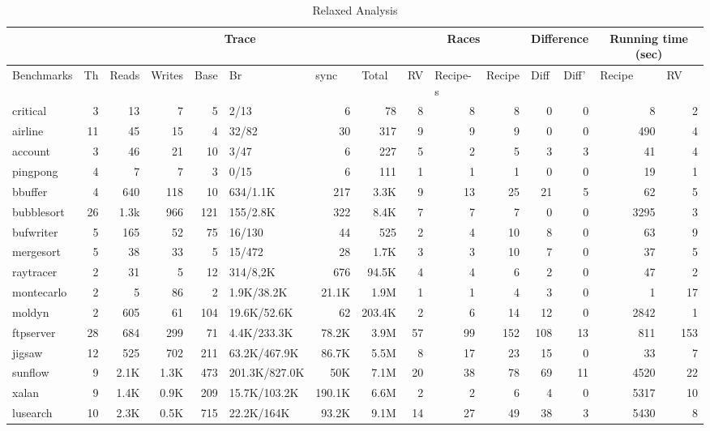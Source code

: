 \begin{table}[htbp]
\caption{Relaxed Analysis}
\begin{tabular}{|l|r|r|r|r|l|r|r|r|r|r|r|r|r|r|}
\hline
 & \multicolumn{ 7}{c|}{Trace} & \multicolumn{ 3}{c|}{Races} & \multicolumn{ 2}{c|}{Difference} & \multicolumn{ 2}{c|}{Running time (sec)} \\ \hline
Benchmarks & \multicolumn{1}{l|}{Th} & \multicolumn{1}{l|}{Reads} & \multicolumn{1}{l|}{Writes} & \multicolumn{1}{l|}{Base} & Br & \multicolumn{1}{l|}{sync} & \multicolumn{1}{l|}{Total} & \multicolumn{1}{l|}{RV} & \multicolumn{1}{l|}{Recipe-s} & \multicolumn{1}{l|}{Recipe} & \multicolumn{1}{l|}{Diff} & \multicolumn{1}{l|}{Diff'} & \multicolumn{1}{l|}{Recipe} & \multicolumn{1}{l|}{RV} \\ \hline
critical & 3 & 13 & 7 & 5 & 2/13 & 6 & 78 & 8 & 8 & 8 & 0 & 0 & 8 & 2 \\ \hline
airline & 11 & 45 & 15 & 4 & 32/82 & 30 & 317 & 9 & 9 & 9 & 0 & 0 & 490 & 4 \\ \hline
account & 3 & 46 & 21 & 10 & 3/47 & 6 & 227 & 5 & 2 & 5 & 3 & 3 & 41 & 4 \\ \hline
pingpong & 4 & 7 & 7 & 3 & 0/15 & 6 & 111 & 1 & 1 & 1 & 0 & 0 & 19 & 1 \\ \hline
bbuffer & 4 & 640 & 118 & 10 & 634/1.1K & 217 & 3.3K & 9 & 13 & 25 & 21 & 5 & 62 & 5 \\ \hline
bubblesort & 26 & 1.3k & 966 & 121 & 155/2.8K & 322 & 8.4K & 7 & 7 & 7 & 0 & 0 & 3295 & 3 \\ \hline
bufwriter & 5 & 165 & 52 & 75 & 16/130 & 44 & 525 & 2 & 4 & 10 & 8 & 0 & 63 & 9 \\ \hline
mergesort & 5 & 38 & 33 & 5 & 15/472 & 28 & 1.7K & 3 & 3 & 10 & 7 & 0 & 37 & 5 \\ \hline
raytracer & 2 & 31 & 5 & 12 & 314/8,2K & 676 & 94.5K & 4 & 4 & 6 & 2 & 0 & 47 & 2 \\ \hline
montecarlo & 2 & 5 & 86 & 2 & 1.9K/38.2K & 21.1K & 1.9M & 1 & 1 & 4 & 3 & 0 & 1 & 17 \\ \hline
moldyn & 2 & 605 & 61 & 104 & 19.6K/52.6K & 62 & 203.4K & 2 & 6 & 14 & 12 & 0 & 2842 & 1 \\ \hline
ftpserver & 28 & 684 & 299 & 71 & 4.4K/233.3K & 78.2K & 3.9M & 57 & 99 & 152 & 108 & 13 & 811 & 153 \\ \hline
jigsaw & 12 & 525 & 702 & 211 & 63.2K/467.9K & 86.7K & 5.5M & 8 & 17 & 23 & 15 & 0 & 33 & 7 \\ \hline
sunflow & 9 & 2.1K & 1.3K & 473 & 201.3K/827.0K & 50K & 7.1M & 20 & 38 & 78 & 69 & 11 & 4520 & 22 \\ \hline
xalan & 9 & 1.4K & 0.9K & 209 & 15.7K/103.2K & 190.1K & 6.6M & 2 & 2 & 6 & 4 & 0 & 5317 & 10 \\ \hline
lusearch & 10 & 2.3K & 0.5K & 715 & 22.2K/164K & 93.2K & 9.1M & 14 & 27 & 49 & 38 & 3 & 5430 & 8 \\ \hline
\end{tabular}
\label{tab:main}
\end{table}



